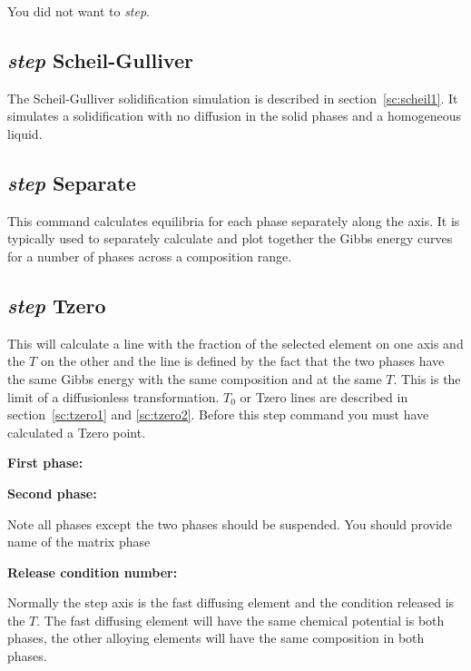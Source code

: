 \documentclass[11pt]{article}
\begin{document}
You did not want to {\em step}.

\hypertarget{Step Scheil}{}
\subsection{{\em step} Scheil-Gulliver}\label{sc:scheil2}

The Scheil-Gulliver solidification simulation is described in
section~\ref{sc:scheil1}.  It simulates a solidification with no
diffusion in the solid phases and a homogeneous liquid.

\hypertarget{Step separate}{}
\subsection{{\em step} Separate}

This command calculates equilibria for each phase separately along the
axis.  It is typically used to separately calculate and plot together
the Gibbs energy curves for a number of phases across a composition
range.

\hypertarget{Step Tzero}{}
\subsection{{\em step} Tzero}\label{sc:tzero3}

This will calculate a line with the fraction of the selected element
on one axis and the $T$ on the other and the line is defined by the
fact that the two phases have the same Gibbs energy with the same
composition and at the same $T$.  This is the limit of a diffusionless
transformation.  $T_0$ or Tzero lines are described in
section~\ref{sc:tzero1} and \ref{sc:tzero2}.  Before this step command
you must have calculated a Tzero point.

{\bf First phase:}
              
{\bf Second phase:}

Note all phases except the two phases should be suspended.  You should
provide name of the matrix phase

{\bf Release condition number:}

Normally the step axis is the fast diffusing element and the condition
released is the $T$.  The fast diffusing element will have the same
chemical potential is both phases, the other alloying elements will
have the same composition in both phases.
\end{document}
